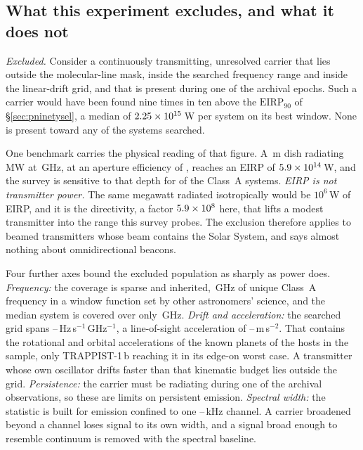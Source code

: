 \subsection{What this experiment excludes, and what it does not}
\label{sec:excludes}

\noindent\emph{Excluded.} Consider a continuously transmitting,
unresolved carrier that lies outside the molecular-line mask, inside the
searched frequency range and inside the linear-drift grid, and that is
present during one of the archival epochs. Such a carrier would have been
found nine times in ten above the $\mathrm{EIRP}_{90}$ of
\S\ref{sec:pninetysel}, a median of $2.25\times10^{15}$\,W per system on
its best window. None is present toward any of the \NSystems{} systems
searched.

One benchmark carries the physical reading of that figure. A \BenchDiam\,m
dish radiating \BenchPowerMW\,MW at \BenchFreqGHz\,GHz, at an aperture
efficiency of \BenchEta, reaches an EIRP of $5.9\times10^{14}$\,W, and the survey
is sensitive to that depth for \BenchNSysA{} of the \NSysClassA{} Class~A
systems. \emph{EIRP is not transmitter power.} The same megawatt radiated
isotropically would be $10^{6}$\,W of EIRP, and it is the directivity, a
factor $5.9\times10^{8}$ here, that lifts a modest transmitter into the range
this survey probes. The exclusion therefore applies to beamed transmitters
whose beam contains the Solar System, and says almost nothing about
omnidirectional beacons.

Four further axes bound the excluded population as sharply as power does.
\emph{Frequency:} the coverage is sparse and inherited, \DnuA\,GHz of unique
Class~A frequency in a window function set by other astronomers' science,
and the median system is covered over only \SysUnionAMed\,GHz. \emph{Drift and acceleration:} the searched grid spans
\DriftCeilLo--\DriftCeilHi\,Hz\,s$^{-1}$\,GHz$^{-1}$, a line-of-sight
acceleration of \AccelCeilMed--\AccelCeilMax\,m\,s$^{-2}$. That contains
the rotational and orbital accelerations of the \NExoPlanetsTab{} known
planets of the \NExoHostsTab{} hosts in the sample, only TRAPPIST-1\,b
reaching it in its edge-on worst case. A transmitter whose own oscillator
drifts faster than that kinematic budget lies outside the grid.
\emph{Persistence:} the carrier must be radiating during one of the archival
observations, so these are limits on persistent emission.
\emph{Spectral width:} the statistic is built for emission confined to one
\ChanLoA--\ChanHiA\,kHz channel. A carrier broadened beyond a channel
loses signal to its own width, and a signal broad enough to resemble
continuum is removed with the spectral baseline.

